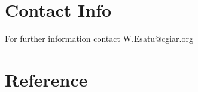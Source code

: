 \documentclass[a4paper,12pt]{article}
\begin{document}
\newpage


\newpage




\newpage
\section{Contact Info}\label{sec:contact_info}

For further information contact W.Esatu@cgiar.org

\newpage
\section{Reference}
\end{document}
